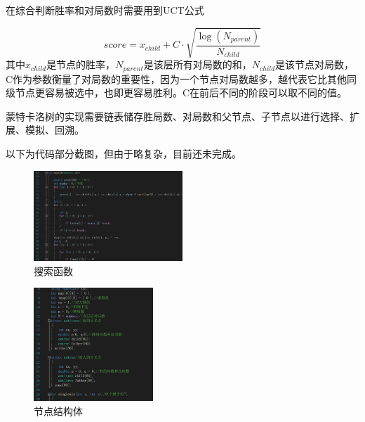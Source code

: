 \documentclass[twocolumn]{article}
\begin{document}
在综合判断胜率和对局数时需要用到UCT公式

$$score=x_{child}+C\cdot \sqrt{\frac{\log(N_{parent})}{N_{child}}}$$
其中$x_{child}$是节点的胜率，$N_{parent}$是该层所有对局数的和，$N_{child}$是该节点对局数，C作为参数衡量了对局数的重要性，因为一个节点对局数越多，越代表它比其他同级节点更容易被选中，也即更容易胜利。C在前后不同的阶段可以取不同的值。

\par

蒙特卡洛树的实现需要链表储存胜局数、对局数和父节点、子节点以进行选择、扩展、模拟、回溯。

\par

以下为代码部分截图，但由于略复杂，目前还未完成。
\begin{figure}[H]
\centering  %
\includegraphics[width=0.5\textwidth]{fig81}
\caption{搜索函数}
\label{Fig.main}
\end{figure}

\begin{figure}[H]
\centering  %
\includegraphics[width=0.4\textwidth]{fig71}
\caption{节点结构体}
\label{Fig.main}
\end{figure}
\end{document}
